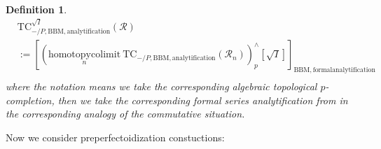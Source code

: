 \documentclass[12pt]{book}
\newtheorem{definition}{Definition}
\begin{document}
\begin{definition}
\begin{align}
& \mathrm{TC}^{\sqrt{I}}_{-/P,\mathrm{BBM},\mathrm{analytification}}(\mathcal{R})\\
&:=[(\underset{n}{\mathrm{homotopycolimit}}~  \mathrm{TC}_{-/P,\mathrm{BBM},\mathrm{analytification}}(\mathcal{R}_n))^\wedge_{p}[\sqrt{I}]]_{\mathrm{BBM},\mathrm{formalanalytification}}\\	
\end{align}
where the notation means we take the corresponding algebraic topological $p$-completion, then we take the corresponding formal series analytification from \cite[4.2]{BBM} in the corresponding analogy of the commutative situation.\\
\end{definition}

\indent Now we consider preperfectoidization constuctions:
\end{document}
